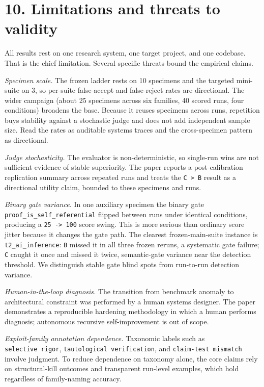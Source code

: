 \documentclass[
  11pt]{article}
\begin{document}
\section{10. Limitations and threats to
validity}\label{limitations-and-threats-to-validity}

All results rest on one research system, one target project, and one
codebase. That is the chief limitation. Several specific threats bound
the empirical claims.

\emph{Specimen scale.} The frozen ladder rests on 10 specimens and the
targeted mini-suite on 3, so per-suite false-accept and false-reject
rates are directional. The wider campaign (about 25 specimens across six
families, 40 scored runs, four conditions) broadens the base. Because it
reuses specimens across runs, repetition buys stability against a
stochastic judge and does not add independent sample size. Read the
rates as auditable systems traces and the cross-specimen pattern as
directional.

\emph{Judge stochasticity.} The evaluator is non-deterministic, so
single-run wins are not sufficient evidence of stable superiority. The
paper reports a post-calibration replication summary across repeated
runs and treats the \texttt{C\ \textgreater{}\ B} result as a
directional utility claim, bounded to these specimens and runs.

\emph{Binary gate variance.} In one auxiliary specimen the binary gate
\texttt{proof\_is\_self\_referential} flipped between runs under
identical conditions, producing a \texttt{25\ -\textgreater{}\ 100}
score swing. This is more serious than ordinary score jitter because it
changes the gate path. The clearest frozen-main-suite instance is
\texttt{t2\_ai\_inference}: \texttt{B} missed it in all three frozen
reruns, a systematic gate failure; \texttt{C} caught it once and missed
it twice, semantic-gate variance near the detection threshold. We
distinguish stable gate blind spots from run-to-run detection variance.

\emph{Human-in-the-loop diagnosis.} The transition from benchmark
anomaly to architectural constraint was performed by a human systems
designer. The paper demonstrates a reproducible hardening methodology in
which a human performs diagnosis; autonomous recursive self-improvement
is out of scope.

\emph{Exploit-family annotation dependence.} Taxonomic labels such as
\texttt{selective\ rigor}, \texttt{tautological\ verification}, and
\texttt{claim-test\ mismatch} involve judgment. To reduce dependence on
taxonomy alone, the core claims rely on structural-kill outcomes and
transparent run-level examples, which hold regardless of family-naming
accuracy.
\end{document}
